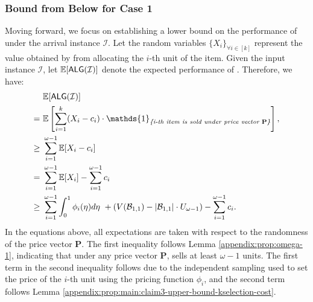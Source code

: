 \subsubsection{Bound \ALG from Below  for Case 1} 
Moving forward, we focus on  establishing a lower bound on the performance of \rDynamic under the arrival instance $\mathcal{I}$. Let the random variables $\{X_{i}\}_{\forall i \in [k]}$ represent the value obtained by \rDynamic from allocating the $i$-th unit of the item. Given the input instance $\mathcal{I}$, let $\mathbb{E}[\textsf{ALG}(\mathcal{I})]$ denote the expected performance of \rDynamic. Therefore, we have:
\begin{align*}
       & \mathbb{E}[\ALG(\mathcal{I})] \\
    =\ & \mathbb{E}\left[\sum_{i=1}^{k} (X_{i} - c_{i}) \cdot \mathds{1}_{\textit{\{i-th item is sold under price vector $\mathbf{P}$\}}}\right],\\
    \geq\ & \sum_{i=1}^{\omega-1} \mathbb{E}[X_{i} - c_{i}]  \\
    = \ & \sum_{i=1}^{\omega-1} \mathbb{E}[X_{i}]  - \sum_{i=1}^{\omega-1}  c_{i} \\
    \ge\ &   \sum_{i=1}^{\omega-1} \int_{0}^{1} \phi_i(\eta) d\eta \ + (V(\mathcal{B}_{1,1}) - |\mathcal{B}_{1,1}| \cdot U_{\omega-1}) - \sum_{i=1}^{\omega-1} c_{i}.
\end{align*}
In the equations above, all expectations are taken with respect to the randomness of the price vector $\mathbf{P}$. The first inequality follows Lemma \ref{appendix:prop:omega-1}, indicating that under any price vector $\mathbf{P}$, \rDynamic sells at least $\omega-1$ units. The first term in the second inequality follows due to the independent sampling used to set the price of the $i$-th unit using the pricing function $\phi_{i}$, and the second term follows Lemma \ref{appendix:prop:main:claim3-upper-bound-kselection-cost}. 

